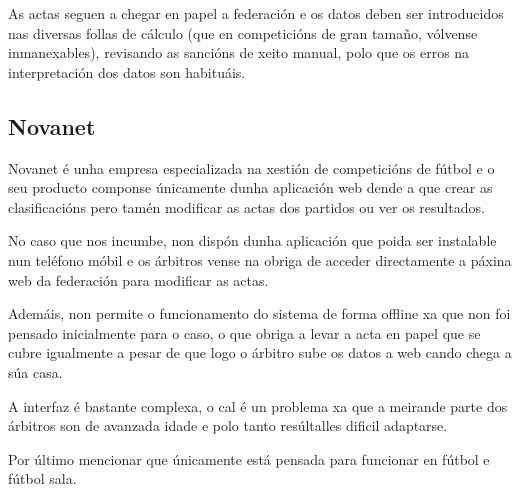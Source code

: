   As actas seguen a chegar en papel a federación e os datos deben ser introducidos nas 
diversas follas de cálculo (que en competicións de gran tamaño, vólvense inmanexables), 
revisando as sancións de xeito manual, polo que os erros na interpretación dos datos son 
habituáis.

\clearpage

    \subsection{Novanet}


      Novanet é unha empresa especializada na xestión de competicións de fútbol 
e o seu producto componse únicamente dunha aplicación web dende a que crear as 
clasificacións pero tamén modificar as actas dos partidos ou ver os resultados.

      No caso que nos incumbe, non dispón dunha aplicación que poida ser instalable nun 
teléfono móbil e os árbitros vense na obriga de acceder directamente a páxina web da 
federación para modificar as actas.
  
      Ademáis, non permite o funcionamento do sistema de forma offline xa que non foi 
pensado inicialmente para o caso, o que obriga a levar a acta en papel que se cubre 
igualmente a pesar de que logo o árbitro sube os datos a web cando chega a súa casa.

      A interfaz é bastante complexa, o cal é un problema xa que a meirande parte dos 
árbitros son de avanzada idade e polo tanto resúltalles dificil adaptarse.

      Por último mencionar que únicamente está pensada para funcionar en fútbol e fútbol 
sala.
	
